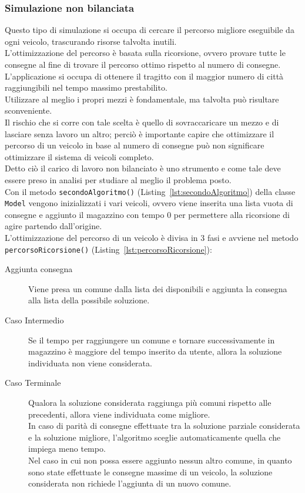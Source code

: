 \documentclass[a4paper,12pt]{report}
\begin{document}
\subsubsection{Simulazione non bilanciata}
Questo tipo di simulazione si occupa di cercare il percorso migliore eseguibile da ogni veicolo, trascurando risorse talvolta inutili.\\
L'ottimizzazione del percorso è basata sulla ricorsione, ovvero provare tutte le consegne al fine
di trovare il percorso ottimo rispetto al numero di consegne.\\
L'applicazione si occupa di ottenere il tragitto con il maggior numero di città raggiungibili nel
tempo massimo prestabilito.\\
Utilizzare al meglio i propri mezzi è fondamentale, ma talvolta può risultare sconveniente.\\
Il rischio che si corre con tale scelta è quello di sovraccaricare un mezzo e di lasciare 
senza lavoro un altro; perciò è importante capire che ottimizzare il percorso di un veicolo in base 
al numero di consegne può non significare ottimizzare il sistema di veicoli completo.\\
Detto ciò il carico di lavoro non bilanciato è uno strumento e come tale deve essere preso in analisi
per studiare al meglio il problema posto.\\
Con il metodo \texttt{secondoAlgoritmo()} (Listing~\ref{lst:secondoAlgoritmo}) della classe \texttt{Model} vengono inizializzati i vari veicoli, ovvero
viene inserita una lista vuota di consegne e aggiunto il magazzino con tempo 0 per permettere
alla ricorsione di agire partendo dall'origine.\\
L'ottimizzazione del percorso di un veicolo è divisa in 3 fasi e avviene nel metodo \texttt{percorsoRicorsione()} (Listing~\ref{lst:percorsoRicorsione}):
\begin{description}
	\item[Aggiunta consegna] Viene presa un comune dalla lista dei disponibili e aggiunta la consegna alla lista della possibile
soluzione.
	\item[Caso Intermedio] Se il tempo per raggiungere un comune e tornare successivamente in magazzino è maggiore
del tempo inserito da utente, allora la soluzione individuata non viene considerata.
	\item[Caso Terminale] Qualora la soluzione considerata raggiunga più comuni rispetto alle precedenti, allora viene
individuata come migliore.\\
In caso di parità di consegne effettuate tra la soluzione parziale considerata e la soluzione 
migliore, l'algoritmo sceglie automaticamente quella che impiega meno tempo.\\
Nel caso in cui non possa essere aggiunto nessun altro comune, in quanto sono state effettuate
le consegne massime di un veicolo, la soluzione considerata non richiede l'aggiunta di un nuovo 
comune.
\end{description}
\end{document}
